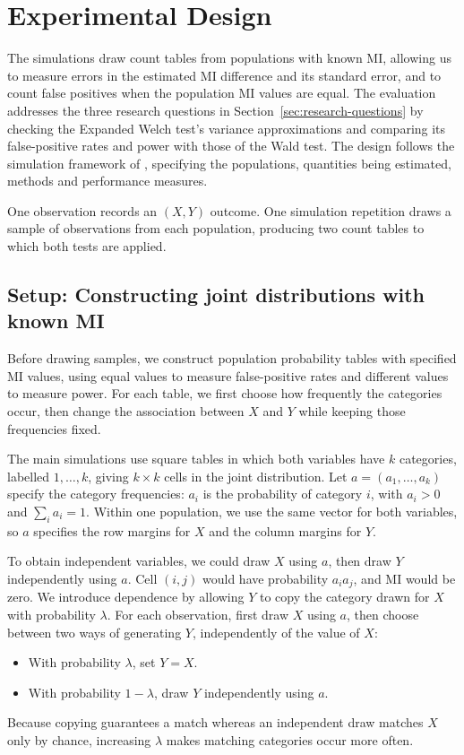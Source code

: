 \chapter{Experimental Design}
\label{chap:design}

The simulations draw count tables from populations with known MI,
allowing us to measure errors in the estimated MI difference and its
standard error, and to count false positives when the population MI
values are equal. The evaluation addresses the three research questions in
Section~\ref{sec:research-questions} by checking the Expanded Welch test's variance
approximations and comparing its false-positive rates and power with those
of the Wald test. The design follows the simulation
framework of \citet{morris2019}, specifying the populations, quantities
being estimated, methods and performance measures.

One observation records an \((X,Y)\) outcome. One simulation repetition
draws a sample of observations from each population, producing two count
tables to which both tests are applied.

\section{Setup: Constructing joint distributions with known MI}

Before drawing samples, we construct population probability tables with
specified MI values, using equal values to measure false-positive rates
and different values to measure power. For each table,
we first choose how frequently the categories occur, then change the
association between \(X\) and \(Y\) while keeping those frequencies fixed.

The main simulations use square tables in which both variables have
\(k\) categories, labelled \(1,\ldots,k\), giving \(k\times k\) cells
in the joint distribution. Let \(a=(a_1,\ldots,a_k)\) specify the category
frequencies: \(a_i\) is the probability of category \(i\), with
\(a_i>0\) and \(\sum_i a_i=1\). Within one population, we use the same vector for both variables,
so \(a\) specifies the row margins for \(X\) and the column margins
for \(Y\).

To obtain independent variables, we could draw \(X\) using \(a\), then
draw \(Y\) independently using \(a\). Cell \((i,j)\) would have
probability \(a_i a_j\), and MI would be zero. We introduce dependence by allowing \(Y\) to copy the category drawn
for \(X\) with probability \(\lambda\). For each
observation, first draw \(X\) using \(a\), then choose between two ways
of generating \(Y\), independently of the value of \(X\):
\begin{itemize}
 \item With probability \(\lambda\), set \(Y=X\).
 \item With probability \(1-\lambda\), draw \(Y\) independently using \(a\).
\end{itemize}
Because copying guarantees a match whereas an independent draw matches
\(X\) only by chance, increasing \(\lambda\) makes matching categories
occur more often.


